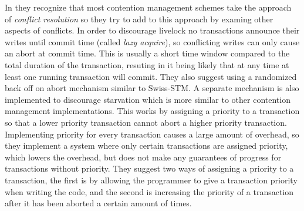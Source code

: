 In \cite{1504199} they recognize that most contention management schemes take the approach of \emph{conflict resolution} so they try to add to this approach by examing other aspects of conflicts.
In order to discourage livelock no transactions announce their writes until commit time (called \emph{lazy acquire}), so conflicting writes can only cause an abort at commit time.
This is usually a short time window compared to the total duration of the transaction, resuting in it being likely that at any time at least one running transaction will commit.
They also suggest using a randomized back off on abort mechanism similar to Swiss-STM.
A separate mechanism is also implemented to discourage starvation which is more similar to other contention management implementations.
This works by assigning a priority to a transaction so that a lower priority transaction cannot abort a higher priority transaction.
Implementing priority for every transaction causes a large amount of overhead, so they implement a system where only certain transactions are assigned priority, which lowers the overhead, but does not make any guarantees of progress for transactions without priority.
They suggest two ways of assigning a priority to a transaction, the first is by allowing the programmer to give a transaction priority when writing the code, and the second is increasing the priority of a transaction after it has been aborted a certain amount of times. 

